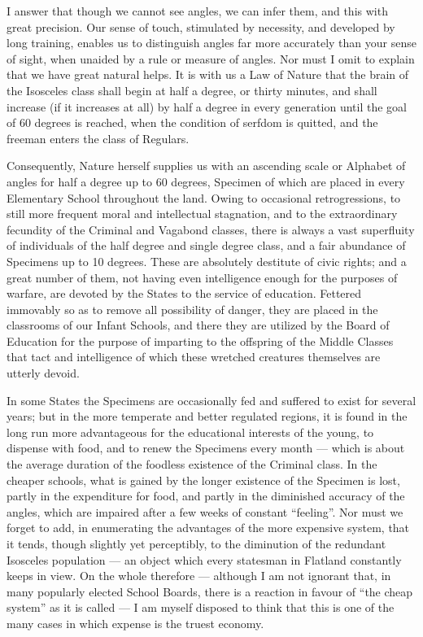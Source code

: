 \documentclass[12pt, a4paper, oneside]{memoir}
\begin{document}
I answer that though we cannot see angles, we can infer them, and this with
great precision. Our sense of touch, stimulated by necessity, and developed by
long training, enables us to distinguish angles far more accurately than your
sense of sight, when unaided by a rule or measure of angles. Nor must I omit
to explain that we have great natural helps. It is with us a Law of Nature
that the brain of the Isosceles class shall begin at half a degree, or thirty
minutes, and shall increase (if it increases at all) by half a degree in every
generation until the goal of 60 degrees is reached, when the condition of
serfdom is quitted, and the freeman enters the class of Regulars.

Consequently, Nature herself supplies us with an ascending scale or Alphabet
of angles for half a degree up to 60 degrees, Specimen of which are placed in
every Elementary School throughout the land. Owing to occasional
retrogressions, to still more frequent moral and intellectual stagnation, and
to the extraordinary fecundity of the Criminal and Vagabond classes, there is
always a vast superfluity of individuals of the half degree and single degree
class, and a fair abundance of Specimens up to 10 degrees. These are
absolutely destitute of civic rights; and a great number of them, not having
even intelligence enough for the purposes of warfare, are devoted by the
States to the service of education. Fettered immovably so as to remove all
possibility of danger, they are placed in the classrooms of our Infant
Schools, and there they are utilized by the Board of Education for the purpose
of imparting to the offspring of the Middle Classes that tact and intelligence
of which these wretched creatures themselves are utterly devoid.

In some States the Specimens are occasionally fed and suffered to exist for
several years; but in the more temperate and better regulated regions, it is
found in the long run more advantageous for the educational interests of the
young, to dispense with food, and to renew the Specimens every month --- which
is about the average duration of the foodless existence of the Criminal class.
In the cheaper schools, what is gained by the longer existence of the Specimen
is lost, partly in the expenditure for food, and partly in the diminished
accuracy of the angles, which are impaired after a few weeks of constant
``feeling''. Nor must we forget to add, in enumerating the advantages of the
more expensive system, that it tends, though slightly yet perceptibly, to the
diminution of the redundant Isosceles population --- an object which every
statesman in Flatland constantly keeps in view. On the whole therefore ---
although I am not ignorant that, in many popularly elected School Boards,
there is a reaction in favour of ``the cheap system'' as it is called --- I am
myself disposed to think that this is one of the many cases in which expense
is the truest economy.
\end{document}
